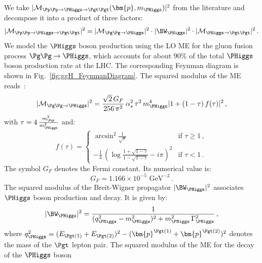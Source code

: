 We take $\vert \mathcal{M}_{\Pp\Pp \to \PHiggs \to
  \Pgt\Pgt}(\bm{p},m_{\PHiggs}) \vert^{2}$ from the literature
and decompose it into a product of three factors:
\begin{equation}
\vert \mathcal{M}_{\Pp\Pp \to \PHiggs \to \Pgt\Pgt} \vert^{2} =
 \vert \mathcal{M}_{\Pg\Pg \to \PHiggs} \vert^{2} 
\cdot \vert \BW_{\PHiggs} \vert^{2} 
\cdot \vert \mathcal{M}_{\PHiggs \to \Pgt\Pgt} \vert^{2} \, .
\label{eq:meHiggsProduction_and_Decay}
\end{equation}
We model the $\PHiggs$ boson production using the LO ME for the gluon fusion process $\Pg\Pg \to \PHiggs$,
which accounts for about $90\%$ of the total $\PHiggs$ boson production rate at the LHC.
The corresponding Feynman diagram is shown in Fig.~\ref{fig:ggH_FeynmanDiagram}.
The squared modulus of the ME reads~\cite{me_ggHprod}:
\begin{equation}
\vert \mathcal{M}_{\Pg\Pg \to \PHiggs} \vert^{2} = 
 \frac{\sqrt{2} \, G_{F}}{256 \, \pi^{2}} \, \alpha_{s}^{2} \, \tau^{2} \, m_{\PHiggs}^{4} \vert 1 + (1 - \tau) \, f(\tau) \vert^{2} \, ,
\label{eq:meHiggsProduction}
\end{equation}
with $\tau = 4\, \frac{m_{\Pqt}^{2}}{m_{\PHiggs}^{2}}$ and:
\begin{equation}
f(\tau) = 
\begin{cases} 
\arcsin^{2} \frac{1}{\sqrt{\tau}}  & \mbox{if } \tau \geq 1 \, , \\
-\frac{1}{4} \, \left( \log\frac{1 + \sqrt{1 - \tau}}{1 - \sqrt{1 - \tau}} - i\pi \right)^{2} & \mbox{if } \tau < 1 \, .
\end{cases}
\label{eq:meHiggsProduction_ftau}
\end{equation}
The symbol $G_{F}$ denotes the Fermi constant. Its numerical value is:
\begin{equation} 
G_{F} = 1.166 \times 10^{-5}\mbox{~GeV}^{-2} \, .
\label{eq:def_G_F} 
\end{equation}
The squared modulus of the Breit-Wigner propagator $\vert \BW_{\PHiggs} \vert^{2}$ associates $\PHiggs$ boson production and decay.
It is given by:
\begin{equation}
\vert \BW_{\PHiggs} \vert^{2} = \frac{1}{(q_{\PHiggs}^{2} -
  m_{\PHiggs}^{2})^{2} + m_{\PHiggs}^{2} \, \Gamma_{\PHiggs}^{2}} \, ,
\label{eq:meHiggsBreitWigner}
\end{equation}
where $q_{\PHiggs}^{2} = (E_{\Pgt(1)} + E_{\Pgt(2)})^{2} - (\bm{p}^{\Pgt(1)} + \bm{p}^{\Pgt(2)})^{2}$ denotes the mass of the $\Pgt$ lepton pair.
The squared modulus of the ME for the decay of the $\PHiggs$ boson
